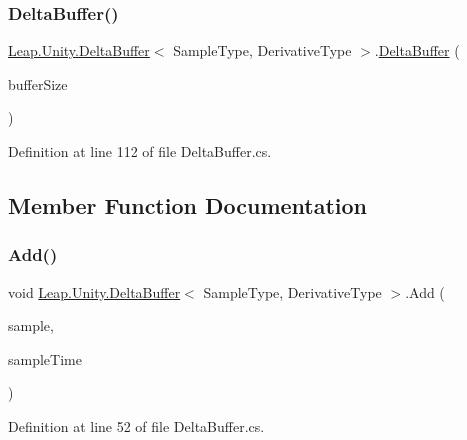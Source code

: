 \subsubsection{\texorpdfstring{DeltaBuffer()}{DeltaBuffer()}\hspace{0.1cm}{\footnotesize\ttfamily [2/2]}}
{\footnotesize\ttfamily \mbox{\hyperlink{class_leap_1_1_unity_1_1_delta_buffer}{Leap.\+Unity.\+Delta\+Buffer}}$<$ Sample\+Type, Derivative\+Type $>$.\mbox{\hyperlink{class_leap_1_1_unity_1_1_delta_buffer}{Delta\+Buffer}} (\begin{DoxyParamCaption}\item[{int}]{buffer\+Size }\end{DoxyParamCaption})}



Definition at line 112 of file Delta\+Buffer.\+cs.



\subsection{Member Function Documentation}
\mbox{\label{class_leap_1_1_unity_1_1_delta_buffer_a570b88b4721427fabda06907c6481f95}} 
\subsubsection{\texorpdfstring{Add()}{Add()}}
{\footnotesize\ttfamily void \mbox{\hyperlink{class_leap_1_1_unity_1_1_delta_buffer}{Leap.\+Unity.\+Delta\+Buffer}}$<$ Sample\+Type, Derivative\+Type $>$.Add (\begin{DoxyParamCaption}\item[{Sample\+Type}]{sample,  }\item[{float}]{sample\+Time }\end{DoxyParamCaption})}



Definition at line 52 of file Delta\+Buffer.\+cs.

\mbox{\label{class_leap_1_1_unity_1_1_delta_buffer_a19423be980871cc58ed3bf2e7d89b05e}} 
